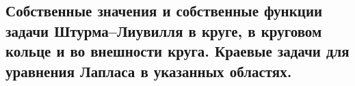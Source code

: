 \subsection{Собственные значения и собственные функции задачи Штурма–Лиувилля в круге, в круговом кольце и во внешности круга. Краевые задачи для уравнения Лапласа в указанных областях.}